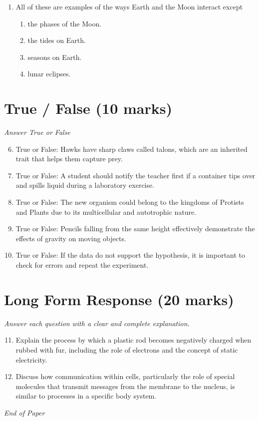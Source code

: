 \documentclass[12pt]{article}
\begin{document}
\begin{enumerate}[label=\arabic*.]
\begin{enumerate}[label=(\alph*)]
    \item increases the supply of resources
    \item decreases the amount of resources
    \item results in less demand for resources
    \item improves the quality of the resources
\end{enumerate}
\item All of these are examples of the ways Earth and the Moon interact except
\begin{enumerate}[label=(\alph*)]
    \item the phases of the Moon.
    \item the tides on Earth.
    \item seasons on Earth.
    \item lunar eclipses.
\end{enumerate}
\end{enumerate}

\section*{True / False (10 marks)}
\textit{Answer True or False}
\begin{enumerate}[label=\arabic*.]
\setcounter{enumi}{5}
\item True or False: Hawks have sharp claws called talons, which are an inherited trait that helps them capture prey.
\item True or False: A student should notify the teacher first if a container tips over and spills liquid during a laboratory exercise.
\item True or False: The new organism could belong to the kingdoms of Protists and Plants due to its multicellular and autotrophic nature.
\item True or False: Pencils falling from the same height effectively demonstrate the effects of gravity on moving objects.
\item True or False: If the data do not support the hypothesis, it is important to check for errors and repeat the experiment.
\end{enumerate}

\section*{Long Form Response (20 marks)}
\textit{Answer each question with a clear and complete explanation.}
\begin{enumerate}[label=\arabic*.]
\setcounter{enumi}{10}
\item Explain the process by which a plastic rod becomes negatively charged when rubbed with fur, including the role of electrons and the concept of static electricity.
\item Discuss how communication within cells, particularly the role of special molecules that transmit messages from the membrane to the nucleus, is similar to processes in a specific body system.
\end{enumerate}

\vfill
\noindent\textit{End of Paper}
\end{document}
